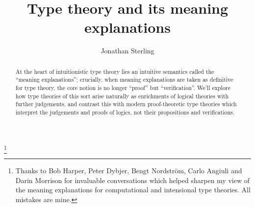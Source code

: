 \documentclass{amsbook}
\theoremstyle{definition}
\theoremstyle{remark}
\numberwithin{equation}{section}
\begin{document}
\title{Type theory and its meaning explanations}
\author{Jonathan Sterling}

\thanks{Thanks to Bob Harper, Peter Dybjer, Bengt Nordstr\"om, Carlo Angiuli
and Darin Morrison for invaluable conversations which helped sharpen my view of
the meaning explanations for computational and intensional type theories. All
mistakes are mine.}


\maketitle

\begin{abstract}
  At the heart of intuitionistic type theory lies an intuitive semantics called
  the ``meaning explanations''; crucially, when meaning explanations are taken as
  definitive for type theory, the core notion is no longer ``proof'' but
  ``verification''. We'll explore how type theories of this sort arise naturally
  as enrichments of logical theories with further judgements, and contrast this
  with modern proof-theoretic type theories which interpret the judgements and
  proofs of logics, not their propositions and verifications.
\end{abstract}

\onehalfspacing

\tableofcontents







\nocite{*}

\end{document}
